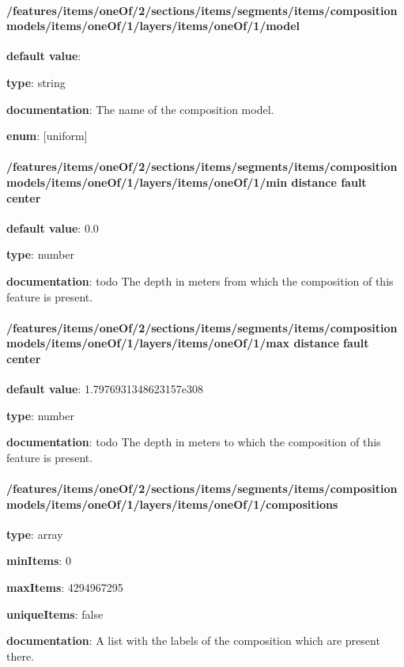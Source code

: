 \paragraph{/features/items/oneOf/2/sections/items/segments/items/composition models/items/oneOf/1/layers/items/oneOf/1/model} \begin{itemized}
\item {\bf default value}: 
\item {\bf type}: string
\item {\bf documentation}: The name of the composition model.
\item {\bf enum}: [uniform]\end{itemized}\paragraph{/features/items/oneOf/2/sections/items/segments/items/composition models/items/oneOf/1/layers/items/oneOf/1/min distance fault center} \begin{itemized}
\item {\bf default value}: 0.0
\item {\bf type}: number
\item {\bf documentation}: todo The depth in meters from which the composition of this feature is present.
\end{itemized}\paragraph{/features/items/oneOf/2/sections/items/segments/items/composition models/items/oneOf/1/layers/items/oneOf/1/max distance fault center} \begin{itemized}
\item {\bf default value}: 1.7976931348623157e308
\item {\bf type}: number
\item {\bf documentation}: todo The depth in meters to which the composition of this feature is present.
\end{itemized}\paragraph{/features/items/oneOf/2/sections/items/segments/items/composition models/items/oneOf/1/layers/items/oneOf/1/compositions} \begin{itemized}
\item {\bf type}: array
\item {\bf minItems}: 0
\item {\bf maxItems}: 4294967295
\item {\bf uniqueItems}: false
\item {\bf documentation}: A list with the labels of the composition which are present there.

\end{itemized}
